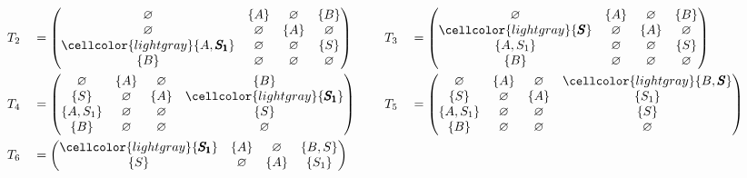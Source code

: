 \begin{example}
{\footnotesize
\begin{alignat*}{7}
& &&T_2 &&= \begin{pmatrix}
\varnothing & \{A\}       & \varnothing & \{B\}       \\
\varnothing & \varnothing & \{A\}       & \varnothing \\
\cellcolor{lightgray} \{A, \pmb{S_1}\}  & \varnothing & \varnothing & \{S\}       \\
\{B\}       & \varnothing & \varnothing & \varnothing \\
\end{pmatrix} \ \ \ \ &&T_3 &&= \begin{pmatrix}
\varnothing & \{A\}       & \varnothing & \{B\}       \\
\cellcolor{lightgray} \{\pmb{S}\}       & \varnothing & \{A\}       & \varnothing \\
\{A, S_1\}  & \varnothing & \varnothing & \{S\}       \\
\{B\}       & \varnothing & \varnothing & \varnothing \\
\end{pmatrix} \\ & &&T_4 &&= \begin{pmatrix}
\varnothing & \{A\}       & \varnothing & \{B\}       \\
\{S\}       & \varnothing & \{A\}       & \cellcolor{lightgray} \{\pmb{S_1}\}     \\
\{A, S_1\}  & \varnothing & \varnothing & \{S\}       \\
\{B\}       & \varnothing & \varnothing & \varnothing \\
\end{pmatrix}  \ \ \ \ &&T_5 &&= \begin{pmatrix}
\varnothing & \{A\}       & \varnothing & \cellcolor{lightgray} \{B, \pmb{S}\}    \\
\{S\}       & \varnothing & \{A\}       & \{S_1\}     \\
\{A, S_1\}  & \varnothing & \varnothing & \{S\}       \\
\{B\}       & \varnothing & \varnothing & \varnothing \\
\end{pmatrix} \\ & &&T_6 &&= \begin{pmatrix}
\cellcolor{lightgray} \{\pmb{S_1}\}     & \{A\}       & \varnothing & \{B, S\}    \\
\{S\}       & \varnothing & \{A\}       & \{S_1\}     \\

\end{pmatrix}
\end{alignat*}}
\end{example}
